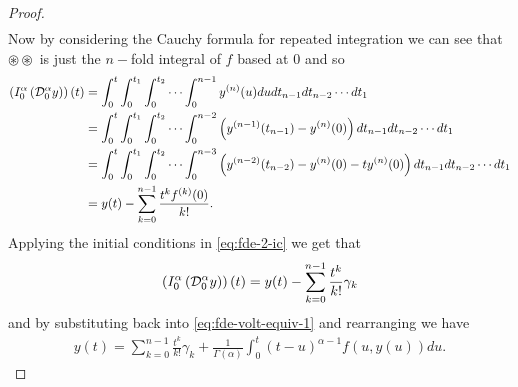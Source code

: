 \documentclass{article}
\begin{document}
\begin{proof}
\begin{align*}
	\end{align*}
	Now by considering the Cauchy formula for repeated integration we can see that $ \circledast \circledast $ is just the $n-$fold integral
	of $ f $ based at $ 0 $ and so
	\begin{align*}
		\left( I_{0}^{\alpha} \left( \mathcal{D}_{0}^{\alpha} y \right) \right)(t) &= \int_0^t \int_0^{t_1} \int_0^{t_2} \cdots \int_0^{n-1} y^{(n)}(u) du dt_{n-1} dt_{n-2} \cdots dt_{1} \\
			&= \int_0^t \int_0^{t_1} \int_0^{t_2} \cdots \int_0^{n-2} \left(y^{(n-1)}(t_{n-1}) - y^{(n)}(0) \right)dt_{n-1}dt_{n-2}\cdots dt_{1} \\
			&= \int_0^t \int_0^{t_1} \int_0^{t_2} \cdots \int_0^{n-3} \left(y^{(n-2)}(t_{n-2}) - y^{(n)}(0) - ty^{(n)}(0) \right)dt_{n-1}dt_{n-2}\cdots dt_{1} \\
			&= y(t) - \sum_{k=0}^{n-1} \frac{t^k f^{(k)}(0)}{k!}.
	\end{align*}
	Applying the initial conditions in \eqref{eq:fde-2-ic} we get that 
	\begin{align*}
		\left( I_{0}^{\alpha} \left( \mathcal{D}_{0}^{\alpha} y \right) \right)(t) = y(t) - \sum_{k=0}^{n-1} \frac{t^k}{k!} \gamma_k
	\end{align*}
	and by substituting back into \eqref{eq:fde-volt-equiv-1} and rearranging we have
	\begin{align*}
		y(t) = \sum_{k=0}^{n-1} \frac{t^k}{k!} \gamma_k + \frac{1}{\Gamma(\alpha)} \int_0^t (t-u)^{\alpha-1} f(u,y(u))du.
	\end{align*}
\end{proof}




\end{document}
